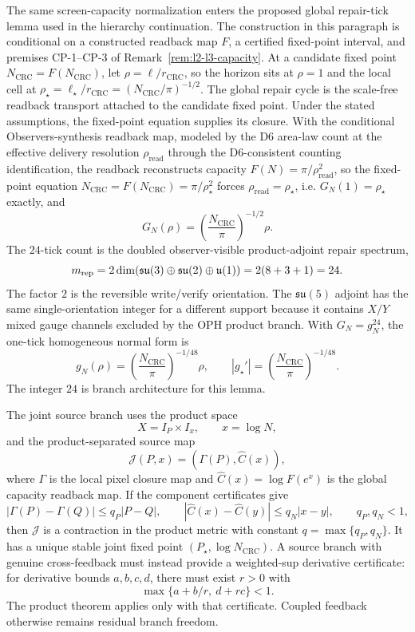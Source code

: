 \documentclass[11pt]{article}
\begin{document}
The same screen-capacity normalization enters the proposed global repair-tick lemma used in the
hierarchy continuation. The construction in this paragraph is conditional on a
constructed readback map \(F\), a certified fixed-point interval, and premises
CP-1--CP-3 of Remark~\ref{rem:l2-l3-capacity}.  At a candidate fixed point
\(N_{\mathrm{CRC}}=F(N_{\mathrm{CRC}})\), let
\(\rho=\ell/r_{\mathrm{CRC}}\), so the horizon sits at \(\rho=1\) and the local cell at
\(\rho_\star=\ell_\star/r_{\mathrm{CRC}}=(N_{\mathrm{CRC}}/\pi)^{-1/2}\). The global repair
cycle is the scale-free readback transport attached to the candidate fixed point. Under the
stated assumptions, the fixed-point equation supplies its closure. With the conditional
Observers-synthesis readback map, modeled by the D6
area-law count at the effective delivery resolution \(\rho_{\mathrm{read}}\) through the
D6-consistent counting identification, the readback reconstructs capacity
\(F(N)=\pi/\rho_{\mathrm{read}}^2\), so the
fixed-point equation \(N_{\mathrm{CRC}}=F(N_{\mathrm{CRC}})=\pi/\rho_\star^2\) forces
\(\rho_{\mathrm{read}}=\rho_\star\), i.e. \(G_N(1)=\rho_\star\) exactly, and
\[
G_N(\rho)
=
\left(\frac{N_{\mathrm{CRC}}}{\pi}\right)^{-1/2}\rho .
\]
The \(24\)-tick count is the doubled observer-visible product-adjoint repair spectrum,
\[
m_{\rm rep}
=2\dim(\mathfrak{su}(3)\oplus\mathfrak{su}(2)\oplus\mathfrak u(1))
=2(8+3+1)
=24.
\]
The factor \(2\) is the reversible write/verify orientation. The \(\mathfrak{su}(5)\) adjoint
has the same single-orientation integer for a different support because it contains \(X/Y\)
mixed gauge channels excluded by the OPH product branch. With \(G_N=g_N^{24}\), the one-tick
homogeneous normal form is
\[
g_N(\rho)
=
\left(\frac{N_{\mathrm{CRC}}}{\pi}\right)^{-1/48}\rho,
\qquad
|g_\star'|
=
\left(\frac{N_{\mathrm{CRC}}}{\pi}\right)^{-1/48}.
\]
The integer \(24\) is branch architecture for this lemma.

The joint source branch uses the product space
\[
X=I_P\times I_x,\qquad x=\log N,
\]
and the product-separated source map
\[
\mathcal J(P,x)=(\Gamma(P),\widehat C(x)),
\]
where \(\Gamma\) is the local pixel closure map and \(\widehat C(x)=\log F(e^x)\) is the
global capacity readback map. If the component certificates give
\[
|\Gamma(P)-\Gamma(Q)|\le q_P|P-Q|,
\qquad
|\widehat C(x)-\widehat C(y)|\le q_N|x-y|,
\qquad
q_P,q_N<1,
\]
then \(\mathcal J\) is a contraction in the product metric with constant
\(q=\max\{q_P,q_N\}\). It has a unique stable joint fixed point
\((P_\star,\log N_{\mathrm{CRC}})\). A source branch with genuine cross-feedback must instead
provide a weighted-sup derivative certificate: for derivative bounds \(a,b,c,d\), there must
exist \(r>0\) with
\[
\max\{a+b/r,\ d+rc\}<1.
\]
The product theorem applies only with that certificate. Coupled feedback otherwise remains
residual branch freedom.
\end{document}

